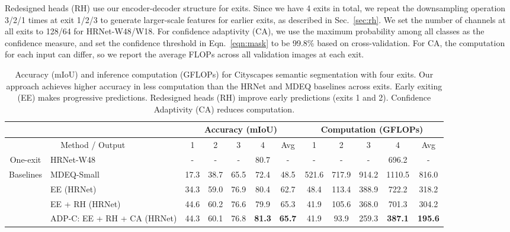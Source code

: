 Redesigned heads (RH) use our encoder-decoder structure for exits.
Since we have 4 exits in total, we repeat the downsampling operation 3/2/1 times at exit 1/2/3 to generate larger-scale features for earlier exits, as described in Sec.~\ref{sec:rh}.
We set the number of channels at all exits to 128/64 for HRNet-W48/W18.
For confidence adaptivity (CA), we use the maximum probability among all classes as the confidence measure, and set the confidence threshold in Eqn.~\ref{eqn:mask} to be 99.8\% based on cross-validation.
For CA, the computation for each input can differ, so we report the average FLOPs across all validation images at each exit. 

\setlength{\tabcolsep}{2pt}
\renewcommand{\arraystretch}{1.2}
\begin{table}[t]
\centering
\footnotesize
\begin{tabular}{c|l|ccccc|ccccc}
\hline
\multicolumn{2}{c|}{}                            & \multicolumn{5}{c}{Accuracy (mIoU)}         & \multicolumn{5}{|c}{Computation (GFLOPs)}            \\ \hline
\multicolumn{2}{c|}{Method / Output}             & 1    & 2    & 3    & 4    & Avg  & 1     & 2     & 3     & 4      & Avg   \\ \hline
 One-exit & HRNet-W48 \cite{wang2020deep}           & -    & -    & -    & 80.7 & -    & -     & -     & -     & 696.2  & -     \\ \hline
\multirow{3}{*}{Baselines} & MDEQ-Small  \cite{bai2020multiscale}      & 17.3 & 38.7 & 65.5 & 72.4 & 48.5 & 521.6 & 717.9 & 914.2 & 1110.5 & 816.0 \\ 
                           & EE (HRNet)      & 34.3 & 59.0 & 76.9 & 80.4 & 62.7 & 48.4  & 113.4 & 388.9 & 722.2  & 318.2 \\
                           \hline
\multirow{2}{*}{Ours}      
                           & EE + RH (HRNet)    & 44.6 & 60.2 & 76.6 & 79.9 & 65.3 & 41.9  & 105.6 & 368.0 & 701.3  & 304.2 \\
                           & ADP-C: EE + RH + CA (HRNet) & 44.3 & 60.1 & 76.8 & \textbf{81.3} & \textbf{65.7} & 41.9  & 93.9  & 259.3 & \textbf{387.1}  & \textbf{195.6} \\ \hline
\end{tabular}
\caption{%
Accuracy (mIoU) and inference computation (GFLOPs) for Cityscapes semantic segmentation with four exits.
Our approach achieves higher accuracy in less computation than the HRNet and MDEQ baselines across exits.
Early exiting (EE) makes progressive predictions.
Redesigned heads (RH) improve early predictions (exits 1 and 2).
Confidence Adaptivity (CA) reduces computation.
}
\label{tab:semseg}
\end{table}


